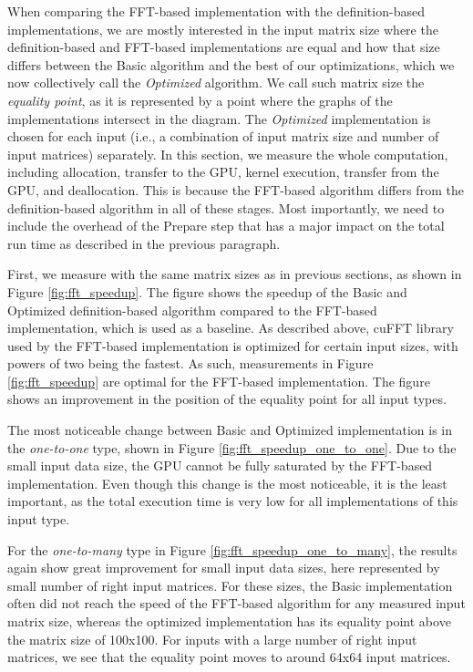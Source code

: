 When comparing the FFT-based implementation with the definition-based implementations, we are mostly interested in the input matrix size where the definition-based and FFT-based implementations are equal and how that size differs between the Basic algorithm and the best of our optimizations, which we now collectively call the \textit{Optimized} algorithm. We call such matrix size the \textit{equality point}, as it is represented by a point where the graphs of the implementations intersect in the diagram. The \textit{Optimized} implementation is chosen for each input (i.e., a combination of input matrix size and number of input matrices) separately. In this section, we measure the whole computation, including allocation, transfer to the GPU, kernel execution, transfer from the GPU, and deallocation. This is because the FFT-based algorithm differs from the definition-based algorithm in all of these stages. Most importantly, we need to include the overhead of the Prepare step that has a major impact on the total run time as described in the previous paragraph.

First, we measure with the same matrix sizes as in previous sections, as shown in Figure \ref{fig:fft_speedup}. The figure shows the speedup of the Basic and Optimized definition-based algorithm compared to the FFT-based implementation, which is used as a baseline. As described above, cuFFT library used by the FFT-based implementation is optimized for certain input sizes, with powers of two being the fastest. As such, measurements in Figure \ref{fig:fft_speedup} are optimal for the FFT-based implementation. The figure shows an improvement in the position of the equality point for all input types.



The most noticeable change between Basic and Optimized implementation is in the \textit{one-to-one} type, shown in Figure \ref{fig:fft_speedup_one_to_one}. Due to the small input data size, the GPU cannot be fully saturated by the FFT-based implementation. Even though this change is the most noticeable, it is the least important, as the total execution time is very low for all implementations of this input type. 

For the \textit{one-to-many} type in Figure \ref{fig:fft_speedup_one_to_many}, the results again show great improvement for small input data sizes, here represented by small number of right input matrices. For these sizes, the Basic implementation often did not reach the speed of the FFT-based algorithm for any measured input matrix size, whereas the optimized implementation has its equality point above the matrix size of 100x100. For inputs with a large number of right input matrices, we see that the equality point moves to around 64x64 input matrices.

